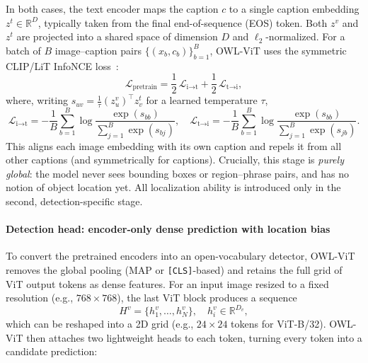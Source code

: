 \begin{enrichment}
\begin{enrichment}[Method][subsection]
		In both cases, the text encoder maps the caption $c$ to a single caption embedding $z^t \in \mathbb{R}^{D}$, typically taken from the final end-of-sequence (EOS) token.
		Both $z^v$ and $z^t$ are projected into a shared space of dimension $D$ and $\ell_2$-normalized.
		For a batch of $B$ image–caption pairs $\{(x_b, c_b)\}_{b=1}^B$, OWL-ViT uses the symmetric CLIP/LiT InfoNCE loss~\cite{radford2021_clip,zhai2022_lit}:
		\[
		\mathcal{L}_{\text{pretrain}}
		= \frac{1}{2}\,\mathcal{L}_{\text{i}\rightarrow\text{t}} + \frac{1}{2}\,\mathcal{L}_{\text{t}\rightarrow\text{i}},
		\]
		where, writing $s_{uv} = \frac{1}{\tau} (z^v_u)^\top z^t_v$ for a learned temperature $\tau$,
		\[
		\mathcal{L}_{\text{i}\rightarrow\text{t}}
		= -\frac{1}{B}\sum_{b=1}^B
		\log
		\frac{\exp(s_{bb})}{\sum_{j=1}^B \exp(s_{bj})},
		\quad
		\mathcal{L}_{\text{t}\rightarrow\text{i}}
		= -\frac{1}{B}\sum_{b=1}^B
		\log
		\frac{\exp(s_{bb})}{\sum_{j=1}^B \exp(s_{jb})}.
		\]
		This aligns each image embedding with its own caption and repels it from all other captions (and symmetrically for captions).
		Crucially, this stage is \emph{purely global}: the model never sees bounding boxes or region–phrase pairs, and has no notion of object location yet.
		All localization ability is introduced only in the second, detection-specific stage.
		
		\paragraph{Detection head: encoder-only dense prediction with location bias}
		To convert the pretrained encoders into an open-vocabulary detector, OWL-ViT removes the global pooling (MAP or \texttt{[CLS]}-based) and retains the full grid of ViT output tokens as dense features.
		For an input image resized to a fixed resolution (e.g., \(768\times 768\)), the last ViT block produces a sequence
		\[
		H^v = \{h^v_1,\dots,h^v_N\},\quad h^v_i \in \mathbb{R}^{D_v},
		\]
		which can be reshaped into a 2D grid (e.g., \(24\times 24\) tokens for ViT-B/32).
		OWL-ViT then attaches two lightweight heads to each token, turning every token into a candidate prediction:
		

\end{enrichment}
\end{enrichment}
